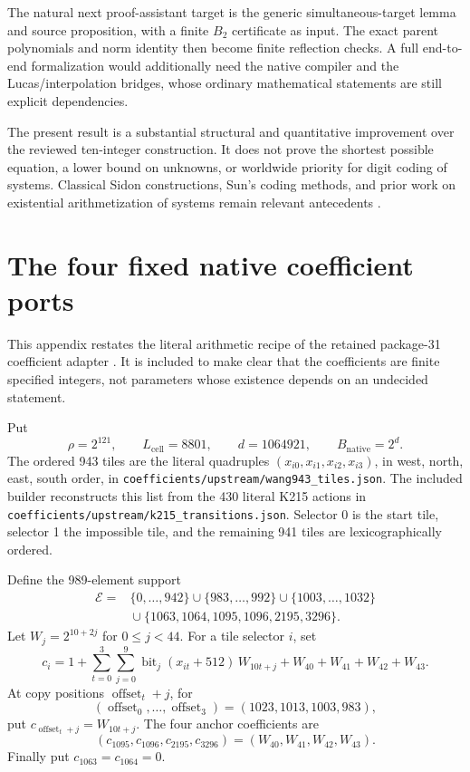 \documentclass[11pt]{article}
\newcommand{\file}[1]{\nolinkurl{#1}}
\theoremstyle{definition}
\theoremstyle{remark}
\numberwithin{equation}{section}
\begin{document}
The natural next proof-assistant target is the generic simultaneous-target
lemma and source proposition, with a finite \(B_2\) certificate as input.
The exact parent polynomials and norm identity then become finite
reflection checks. A full end-to-end formalization would additionally
need the native compiler and the Lucas/interpolation bridges, whose
ordinary mathematical statements are still explicit dependencies.

The present result is a substantial structural and quantitative
improvement over the reviewed ten-integer construction. It does not
prove the shortest possible equation, a lower bound on unknowns,
or worldwide priority for digit coding of systems. Classical
Sidon constructions, Sun's coding methods, and prior work on
existential arithmetization of systems remain relevant antecedents
\cite{bosechowla,obryant,sun2021,matiyasevich2009}.

\appendix
\section{The four fixed native coefficient ports}
\label{app:constants}

This appendix restates the literal arithmetic recipe of the retained
package-31 coefficient adapter \cite{package31}. It is included to make
clear that the coefficients are finite specified integers, not parameters
whose existence depends on an undecided statement.

Put
\[
 \rho=2^{121},\qquad L_{\mathrm{cell}}=8801,\qquad
 d=1064921,\qquad B_{\mathrm{native}}=2^d.
\]
The ordered 943 tiles are the literal quadruples
\((x_{i0},x_{i1},x_{i2},x_{i3})\), in west, north, east, south order,
in \file{coefficients/upstream/wang943_tiles.json}.
The included builder reconstructs this list from the 430 literal K215
actions in \file{coefficients/upstream/k215_transitions.json}.
Selector 0 is the start tile, selector 1 the impossible tile, and the
remaining 941 tiles are lexicographically ordered.

Define the 989-element support
\[
\begin{split}
\mathcal E={}&\{0,\ldots,942\}\cup\{983,\ldots,992\}
 \cup\{1003,\ldots,1032\}\\
 &{}\cup\{1063,1064,1095,1096,2195,3296\}.
\end{split}
\]
Let \(W_j=2^{10+2j}\) for \(0\le j<44\). For a tile selector \(i\), set
\[
 c_i=1+\sum_{t=0}^{3}\sum_{j=0}^{9}
       \operatorname{bit}_j(x_{it}+512)\,W_{10t+j}
       +W_{40}+W_{41}+W_{42}+W_{43}.
\]
At copy positions \(\operatorname{offset}_t+j\), for
\[
 (\operatorname{offset}_0,\ldots,\operatorname{offset}_3)
   =(1023,1013,1003,983),
\]
put \(c_{\operatorname{offset}_t+j}=W_{10t+j}\).
The four anchor coefficients are
\[
 (c_{1095},c_{1096},c_{2195},c_{3296})
       =(W_{40},W_{41},W_{42},W_{43}).
\]
Finally put \(c_{1063}=c_{1064}=0\).
\end{document}
